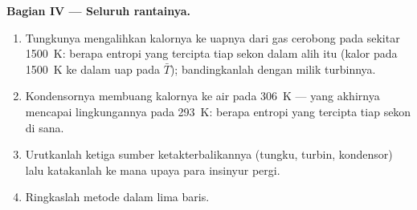 \begin{problem}
\textbf{Bagian IV --- Seluruh rantainya.}
\begin{enumerate}[resume]
  \item Tungkunya mengalihkan kalornya ke uapnya dari gas cerobong pada
        sekitar \qty{1500}{K}: berapa entropi yang tercipta tiap sekon dalam alih itu
        (kalor pada \qty{1500}{K} ke dalam uap pada $\bar T$); bandingkanlah dengan
        milik turbinnya.
  \item Kondensornya membuang kalornya ke air pada \qty{306}{K} ---
        yang akhirnya mencapai lingkungannya pada \qty{293}{K}: berapa entropi
        yang tercipta tiap sekon di sana.
  \item Urutkanlah ketiga sumber ketakterbalikannya (tungku, turbin,
        kondensor) lalu katakanlah ke mana upaya para insinyur pergi.
  \item Ringkaslah metode  dalam lima baris.
\end{enumerate}
\end{problem}
